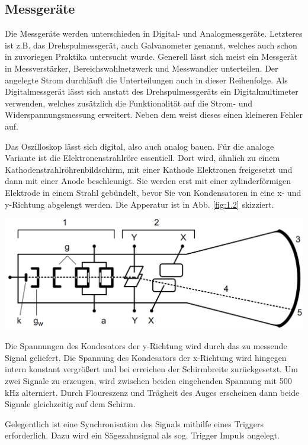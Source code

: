 \documentclass[10pt]{article}
\newenvironment{Figure}
  {\par\medskip\noindent\minipage{\linewidth}}
  {\endminipage\par\medskip}
\begin{document}
\begin{multicols}{2}
	\subsection{Messgeräte}
	Die Messgeräte werden unterschieden in Digital- und Analogmessgeräte. Letzteres ist z.B. das Drehspulmessgerät, auch Galvanometer genannt, welches auch schon in zuvoriegen Praktika untersucht wurde. Generell lässt sich meist ein Messgerät in Messverstärker, Bereichswahlnetzwerk und Messwandler unterteilen. Der angelegte Strom durchläuft die Unterteilungen auch in dieser Reihenfolge. Als Digitalmessgerät lässt sich anstatt des Drehspulmessgeräts ein Digitalmultimeter verwenden, welches zusätzlich die Funktionalität auf die Strom- und Widerspannungsmessung erweitert. Neben dem weist dieses einen kleineren Fehler auf.

	Das Oszilloskop lässt sich digital, also auch analog bauen. Für die analoge Variante ist die Elektronenstrahlröre essentiell. Dort wird, ähnlich zu einem Kathodenstrahlröhrenbildschirm, mit einer Kathode Elektronen freigesetzt und dann mit einer Anode beschleunigt. Sie werden erst mit einer zylinderförmigen Elektrode in einem Strahl gebündelt, bevor Sie von Kondensatoren in eine x- und y-Richtung abgelengt werden. Die Apperatur ist in Abb. \ref{fig:1.2} skizziert.

	\begin{Figure}
		\centering
		\includegraphics[width=0.9\linewidth]{Osziloskop.png}
		\label{fig:1.2}
	\end{Figure}

	Die Spannungen des Kondesators der y-Richtung wird durch das zu messende Signal geliefert. Die Spannung des Kondesators der x-Richtung wird hingegen intern konstant vergrößert und bei erreichen der Schirmbreite zurückgesetzt. Um zwei Signale zu erzeugen, wird zwischen beiden eingehenden Spannung mit 500 kHz alterniert. Durch Floureszenz und Trägheit des Auges erscheinen dann beide Signale gleichzeitig auf dem Schirm.

	Gelegentlich ist eine Synchronisation des Signals mithilfe eines Triggers erforderlich. Dazu wird ein Sägezahnsignal als sog. Trigger Impuls angelegt.


\end{multicols}
\end{document}
